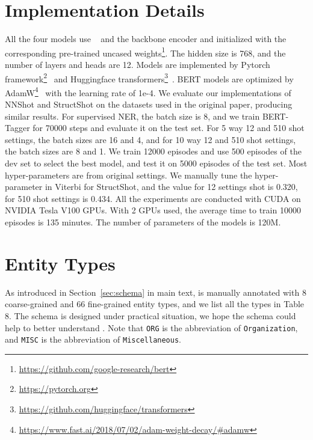 \documentclass[11pt,a4paper, dvipsnames]{article}
\begin{document}
\section{Implementation Details}

All the four models use ~\cite{devlin2018bert} and the backbone encoder and initialized with the corresponding pre-trained uncased weights\footnote{\url{https://github.com/google-research/bert}}. 
The hidden size is 768, and the number of layers and heads are 12.  Models are implemented by Pytorch framework\footnote{\url{https://pytorch.org}}~\cite{paszke2019pytorch} and  Huggingface transformers\footnote{\url{https://github.com/huggingface/transformers}}~\cite{wolf2019huggingface}.
BERT models are optimized by AdamW\footnote{\url{https://www.fast.ai/2018/07/02/adam-weight-decay/\#adamw}}~\cite{loshchilov2018decoupled} with the learning rate of 1e-4. We evaluate our implementations of NNShot and StructShot on the datasets used in the original paper, producing similar results.
For supervised NER, the batch size is 8, and we train BERT-Tagger for 70000 steps and evaluate it on the test set.
For 5 way 12 and 510 shot settings, the batch sizes are 16 and 4, and for 10 way 12 and 510 shot settings, the batch sizes are 8 and 1. We train 12000 episodes and use 500 episodes of the dev set to select the best model, and test it on 5000 episodes of the test set. Most hyper-parameters are from original settings. We manually tune the hyper-parameter \textit{} in Viterbi for StructShot, and the value for 12 settings shot is 0.320, for 510 shot settings is 0.434.
All the experiments are conducted with CUDA on NVIDIA Tesla V100 GPUs. With 2 GPUs used, the average time to train 10000 episodes is 135 minutes. The number of parameters of the models is 120M. 



\section{Entity Types}
As introduced in Section~\ref{sec:schema} in main text,  is manually annotated with 8 coarse-grained and 66 fine-grained entity types, and we list all the types in Table 8. The schema is designed under practical situation, we hope the schema could help to better understand . Note that \texttt{ORG} is the abbreviation of \texttt{Organization}, and \texttt{MISC} is the abbreviation of \texttt{Miscellaneous}.

\onecolumn
\end{document}
